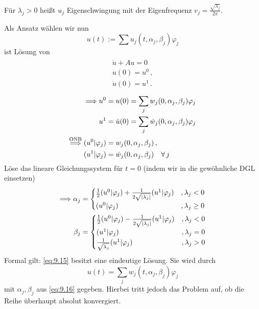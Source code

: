 \begin{bem*}
Für $\lambda_j > 0$ heißt $u_j$ Eigenschwingung mit der Eigenfrequenz $v_j = \frac{\sqrt{\lambda_j}}{2\pi}$.
\end{bem*}

Als Ansatz wählen wir nun
\[
	u(t) := \sum u_j (t,\alpha_j,\beta_j)\varphi_j
\]
ist Lösung von
\begin{align}
\label{eq:9.15}
\begin{aligned}
\ddot u + Au = 0 \,   \\
u(0) = u^0 \, , \\
\dot u (0) = u^1 \, .
\end{aligned}
\end{align}
\begin{align*}
\Longrightarrow u^0 &= u(0) = \sum_j w_j (0,\alpha_j,\beta_j) \varphi_j \\
u^1 &= \dot u(0) = \sum_j \dot w_j (0,\alpha_j,\beta_j) \varphi_j \\
\stackrel{\scriptsize\text{ONB}}{\Longrightarrow} (u^0|\varphi_j) & = w_j(0,\alpha_j,\beta_j) \, , \\
(u^1|\varphi_j) & = \dot w_j(0,\alpha_j,\beta_j) \quad \forall \, j  
\end{align*}
Löse das lineare Gleichungssystem für $t = 0$ (indem wir in die gewöhnliche DGL einsetzen)
\begin{align}
\label{eq:9.16}
\begin{aligned}
	\Longrightarrow \alpha_j & = \begin{cases}
					\frac 1 2 (u^0|\varphi_j) + \frac 1{2\sqrt{\lvert \lambda_j\rvert}} (u^1|\varphi_j) & , \lambda_j < 0 \\
					(u^0|\varphi_j) & , \lambda_j \geq 0 
				\end{cases} \\
	\beta_j & = \begin{cases}
				\frac 12 (u^0|\varphi_j) - \frac 1{2\sqrt{\lvert \lambda_j\rvert}} (u^1|\varphi_j) & , \lambda_j < 0 \\
				(u^1|\varphi_j) & , \lambda_j = 0 \\
				\frac 1{\sqrt{\lambda_j}}(u^1|\varphi_j) & , \lambda_j > 0
			\end{cases}
\end{aligned}
\end{align}
Formal gilt: \eqref{eq:9.15} besitzt eine eindeutige Lösung. Sie wird durch
\[
	u(t) = \sum_j w_j (t,\alpha_j,\beta_j) \varphi_j
\]
mit $\alpha_j, \beta_j$ aus \eqref{eq:9.16} gegeben. Hierbei tritt jedoch das Problem auf, ob die Reihe überhaupt absolut konvergiert.


